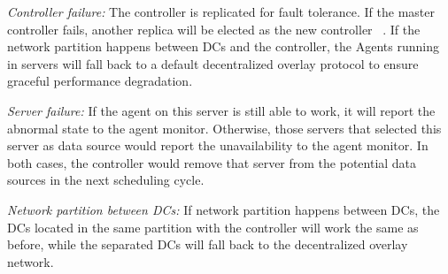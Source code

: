 \begin{packedenumerate}
\item \emph{Controller failure:} The controller is replicated for fault tolerance. If the master controller fails, another replica will be elected as the new controller ~\cite{lamport1998part}. If the network partition happens between DCs and the controller, the Agents running in servers will fall back to a default decentralized overlay protocol to ensure graceful performance degradation.
\item \emph{Server failure:} If the agent on this server is still able to work, it will report the abnormal state to the agent monitor. Otherwise, those servers that selected this server as data source would report the unavailability to the agent monitor. In both cases, the controller would remove that server from the potential data sources in the next scheduling cycle.
\item \emph{Network partition between DCs:}
If network partition happens between DCs, the DCs located in the same partition with the controller will work the same as before, while the separated DCs will fall back to the decentralized overlay network.
\end{packedenumerate}
%
%
%
%
%




